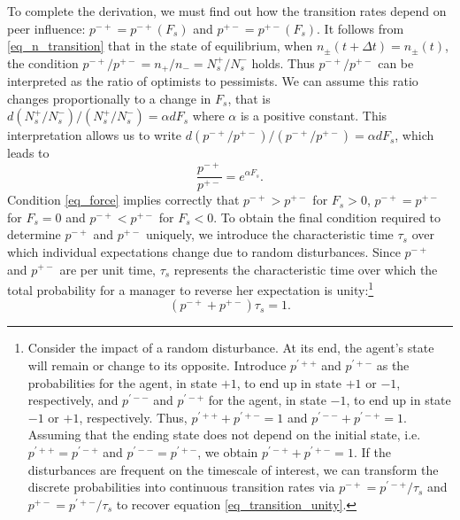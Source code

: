 \documentclass[authoryear, review]{elsarticle}
\begin{document}
To complete the derivation, we must find out how the transition rates depend on peer influence: $p^{-+}=p^{-+}(F_s)$ and $p^{+-}=p^{+-}(F_s)$. It follows from \eqref{eq_n_transition} that in the state of equilibrium, when $n_\pm(t+\Delta t)=n_\pm(t)$, the condition ${p^{-+}}/{p^{+-}}={n_+}/{n_-}={N_{s}^+}/{N_{s}^-}$ holds. Thus ${p^{-+}}/{p^{+-}}$ can be interpreted as the ratio of optimists to pessimists. We can assume this ratio changes proportionally to a change in $F_s$, that is $d{\left(N_{s}^+/N_{s}^-\right)}/\left(N_{s}^+/N_{s}^-\right)=\alpha d F_s$ where $\alpha$ is a positive constant. This interpretation allows us to write $d{\left(p^{-+}/p^{+-}\right)}/\left(p^{-+}/p^{+-}\right)=\alpha d F_s$, which leads to
\begin{equation}\label{eq_force}
	\frac{p^{-+}}{p^{+-}}=e^{\alpha F_s}.
\end{equation}
Condition \eqref{eq_force} implies correctly that $p^{-+}>p^{+-}$ for $F_s>0$, $p^{-+}=p^{+-}$ for $F_s=0$ and $p^{-+}<p^{+-}$ for $F_s<0$. 
To obtain the final condition required to determine $p^{-+}$ and $p^{+-}$ uniquely, we introduce the characteristic time $\tau_s$ over which individual expectations change due to random disturbances. Since $p^{-+}$ and $p^{+-}$ are per unit time, $\tau_s$ represents the characteristic time over which the total probability for a manager to reverse her expectation is unity:\footnote{
	Consider the impact of a random disturbance. At its end, the agent's state will remain or change to its opposite. Introduce $p^{'++}$ and $p^{'+-}$ as the probabilities for the agent, in state $+1$, to end up in state $+1$ or $-1$, respectively, and $p^{'--}$ and $p^{'-+}$ for the agent, in state $-1$, to end up in state $-1$ or $+1$, respectively. Thus, $p^{'++}+p^{'+-}=1$ and $p^{'--}+p^{'-+}=1$. Assuming that the ending state does not depend on the initial state, i.e. $p^{'++}=p^{'-+}$ and $p^{'--}=p^{'+-}$, we obtain $p^{'-+}+p^{'+-}=1$. If the disturbances are frequent on the timescale of interest, we can transform the discrete probabilities into continuous transition rates via $p^{-+}={p^{'-+}}/{\tau_s}$ and $p^{+-}={p^{'+-}}/{\tau_s}$ to recover equation \eqref{eq_transition_unity}.
}
\begin{equation}\label{eq_transition_unity}
(p^{-+}+p^{+-})\tau_s=1.
\end{equation}
\end{document}
